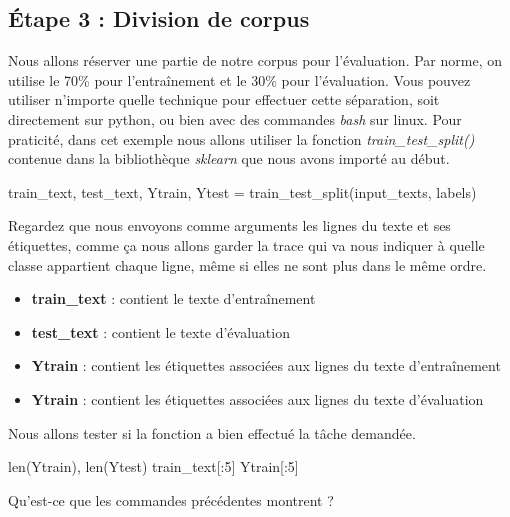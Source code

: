 





\subsection{Étape 3 : Division de corpus}

Nous allons réserver une partie de notre corpus pour l'évaluation. Par norme, on utilise le 70\% pour l'entraînement et le 30\% pour l'évaluation. Vous pouvez utiliser n'importe quelle technique pour effectuer cette séparation, soit directement sur python, ou bien avec des commandes \textit{bash} sur linux. Pour praticité, dans cet exemple nous allons utiliser la fonction \textit{train\_test\_split()} contenue dans la bibliothèque \textit{sklearn} que nous avons importé au début. 

\begin{python}
train_text, test_text, Ytrain, Ytest = 
train_test_split(input_texts, labels)
\end{python}
Regardez que nous envoyons comme arguments les lignes du texte et ses étiquettes, comme ça nous allons garder la trace qui va nous indiquer à quelle classe appartient chaque ligne, même si elles ne sont plus dans le même ordre.

\begin{itemize}
	\item \textbf{train\_text} : contient le texte d’entraînement
	\item \textbf{test\_text} : contient le texte d'évaluation
	\item \textbf{Ytrain} : contient les étiquettes associées aux lignes du texte d'entraînement
	\item \textbf{Ytrain} : contient les étiquettes associées aux lignes du texte d'évaluation
\end{itemize}

Nous allons tester si la fonction a bien effectué la tâche demandée.
\begin{python}
len(Ytrain), len(Ytest)
train_text[:5]
Ytrain[:5]
\end{python}
Qu'est-ce que les commandes précédentes montrent ?

